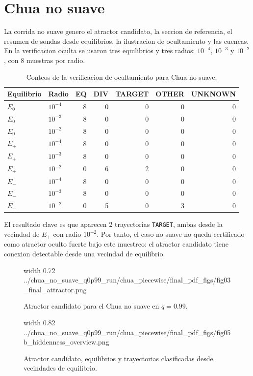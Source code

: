 \documentclass[11pt]{article}
\newcommand{\img}[2]{%
  \begingroup
  \pdfximage width #1 {#2}%
  \pdfrefximage\pdflastximage
  \endgroup
}
\begin{document}
\section*{Chua no suave}

La corrida no suave genero el atractor candidato, la seccion de referencia, el
resumen de sondas desde equilibrios, la ilustracion de ocultamiento y las
cuencas. En la verificacion oculta se usaron tres equilibrios y tres radios:
\(10^{-4}\), \(10^{-3}\) y \(10^{-2}\), con 8 muestras por radio.

\begin{table}[H]
\centering
\caption{Conteos de la verificacion de ocultamiento para Chua no suave.}
\begin{tabular}{llrrrrr}
\toprule
Equilibrio & Radio & EQ & DIV & TARGET & OTHER & UNKNOWN \\
\midrule
\(E_0\) & \(10^{-4}\) & 8 & 0 & 0 & 0 & 0 \\
\(E_0\) & \(10^{-3}\) & 8 & 0 & 0 & 0 & 0 \\
\(E_0\) & \(10^{-2}\) & 8 & 0 & 0 & 0 & 0 \\
\(E_+\) & \(10^{-4}\) & 8 & 0 & 0 & 0 & 0 \\
\(E_+\) & \(10^{-3}\) & 8 & 0 & 0 & 0 & 0 \\
\(E_+\) & \(10^{-2}\) & 0 & 6 & 2 & 0 & 0 \\
\(E_-\) & \(10^{-4}\) & 8 & 0 & 0 & 0 & 0 \\
\(E_-\) & \(10^{-3}\) & 8 & 0 & 0 & 0 & 0 \\
\(E_-\) & \(10^{-2}\) & 0 & 5 & 0 & 3 & 0 \\
\bottomrule
\end{tabular}
\end{table}

El resultado clave es que aparecen 2 trayectorias \texttt{TARGET}, ambas desde
la vecindad de \(E_+\) con radio \(10^{-2}\). Por tanto, el caso no suave no
queda certificado como atractor oculto fuerte bajo este muestreo: el atractor
candidato tiene conexion detectable desde una vecindad de equilibrio.

\begin{figure}[H]
\centering
\img{0.72\textwidth}{../chua_no_suave_q0p99_run/chua_piecewise/final_pdf_figs/fig03_final_attractor.png}
\caption{Atractor candidato para el Chua no suave en \(q=0.99\).}
\end{figure}

\begin{figure}[H]
\centering
\img{0.82\textwidth}{../chua_no_suave_q0p99_run/chua_piecewise/final_pdf_figs/fig05b_hiddenness_overview.png}
\caption{Atractor candidato, equilibrios y trayectorias clasificadas desde vecindades de equilibrio.}
\end{figure}
\end{document}
